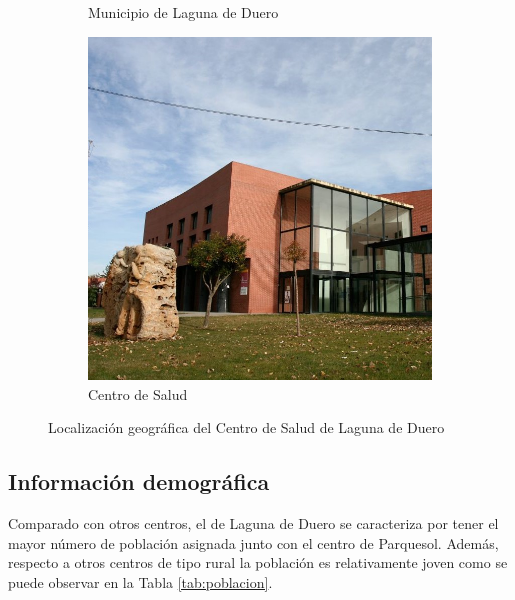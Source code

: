 \begin{figure}[H]
\begin{subfigure}[H]{0.48\textwidth}
        \caption{Municipio de Laguna de Duero}
    \end{subfigure}
    \hfill
    \begin{subfigure}[H]{0.48\textwidth}
        \centering
        \includegraphics*[width=\textwidth]{img/centro-salud.jpg}
        \caption{Centro de Salud}
    \end{subfigure}
    \caption{Localización geográfica del Centro de Salud de Laguna de Duero}
    \label{fig:localizacion-centro}
\end{figure}

\subsection{Información demográfica}

Comparado con otros centros, el de Laguna de Duero se caracteriza por tener el mayor número de población asignada junto con el centro de Parquesol. Además, respecto a otros centros de tipo rural la población es relativamente joven como se puede observar en la Tabla \ref{tab:poblacion}.


